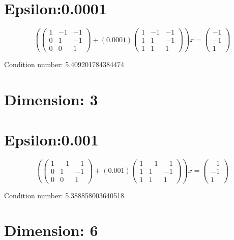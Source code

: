 \documentclass{article}%
\begin{document}
\section{Epsilon:0.0001}%
\label{sec:Epsilon0.0001}%
\[%
( \begin{pmatrix}%
1&-1&-1\\%
0&1&-1\\%
0&0&1%
\end{pmatrix} + ( 0.0001 ) \begin{pmatrix}%
1&-1&-1\\%
1&1&-1\\%
1&1&1%
\end{pmatrix} )x = \begin{pmatrix}%
-1\\%
-1\\%
1%
\end{pmatrix}%
\]%
\begin{Large}%
Condition number:%
5.409201784384474%
\end{Large}

%
\section{Dimension: 3}%
\label{sec:Dimension3}%
\section{Epsilon:0.001}%
\label{sec:Epsilon0.001}%
\[%
( \begin{pmatrix}%
1&-1&-1\\%
0&1&-1\\%
0&0&1%
\end{pmatrix} + ( 0.001 ) \begin{pmatrix}%
1&-1&-1\\%
1&1&-1\\%
1&1&1%
\end{pmatrix} )x = \begin{pmatrix}%
-1\\%
-1\\%
1%
\end{pmatrix}%
\]%
\begin{Large}%
Condition number:%
5.388858003640518%
\end{Large}

%
\section{Dimension: 6}%
\label{sec:Dimension6}%
\end{document}
